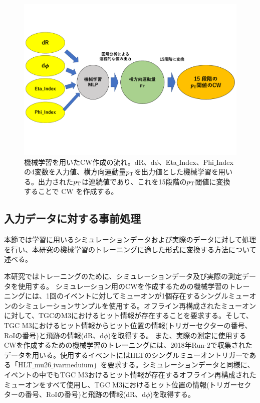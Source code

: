 \begin{figure}[tb]
  \centering
  \includegraphics[clip, width=15cm]{fig/4/MLPoverview2.pdf}
  \caption{機械学習を用いたCW作成の流れ。dR、d$\phi$、Eta$\_$Index、Phi$\_$Indexの4変数を入力値、横方向運動量$p_{\rm{T}}$を出力値とした機械学習を用いる。出力された$p_{\rm{T}}$は連続値であり、これを15段階の$p_{\rm{T}}$閾値に変換することで CW を作成する。}
  \label{fig:MLP_over}
\end{figure}

\subsection{入力データに対する事前処理}\label{事前処理}
本節では学習に用いるシミュレーションデータおよび実際のデータに対して処理を行い、本研究の機械学習のトレーニングに適した形式に変換する方法について述べる。

本研究ではトレーニングのために、シミュレーションデータ及び実際の測定データを使用する。
シミュレーション用のCWを作成するための機械学習のトレーニングには、1回のイベントに対してミューオンが1個存在するシングルミューオンのシミュレーションサンプルを使用する。オフライン再構成されたミューオンに対して、TGCのM3におけるヒット情報が存在することを要求する。そして、TGC M3におけるヒット情報からヒット位置の情報(トリガーセクターの番号、RoIの番号)と飛跡の情報(dR、d$\phi$)を取得する。
また、実際の測定に使用するCWを作成するための機械学習のトレーニングには、2018年Run-2で収集されたデータを用いる。使用するイベントにはHLTのシングルミューオントリガーである「HLT$\_$mu26$\_$ivarmeduium」を要求する。シミュレーションデータと同様に、イベントの中でもTGC M3おけるヒット情報が存在するオフライン再構成されたミューオンをすべて使用し、TGC M3におけるヒット位置の情報(トリガーセクターの番号、RoIの番号)と飛跡の情報(dR、d$\phi$)を取得する。


